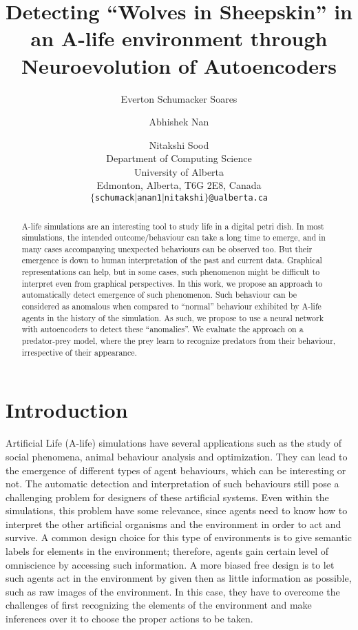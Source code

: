 \documentclass[letterpaper]{article}
\title{ Detecting ``Wolves in Sheepskin'' in an A-life environment through Neuroevolution of Autoencoders}
\author{Everton Schumacker Soares \and Abhishek Nan \and Nitakshi Sood \\
Department of Computing Science \\ University of Alberta \\
Edmonton, Alberta, T6G 2E8, Canada \\
{\tt $\{$schumack$\mid$anan1$\mid$nitakshi$\}$@ualberta.ca}}
\numberwithin{equation}{section}
\numberwithin{theorem}{section}
\numberwithin{lemma}{section}
\numberwithin{df}{section}
\begin{document}
\maketitle

\begin{abstract}
A-life simulations are an interesting tool to study life in a digital petri dish. In most simulations, the intended outcome/behaviour can take a long time to emerge, and in many cases accompanying unexpected behaviours can be observed too. But their emergence is down to human interpretation of the past and current data. Graphical representations can help, but in some cases, such phenomenon might be difficult to interpret even from graphical perspectives. In this work, we propose an approach to automatically detect emergence of such phenomenon. Such behaviour can be considered as anomalous when compared to “normal” behaviour exhibited by A-life agents in the history of the simulation. As such, we propose to use a neural network with autoencoders to detect these “anomalies”. We evaluate the approach on a predator-prey model, where the prey learn to recognize predators from their behaviour, irrespective of their appearance.
\end{abstract}

\section{Introduction}

Artificial Life (A-life) simulations have several applications such as the study of social phenomena, animal behaviour analysis and optimization. They can lead to the emergence of different types of agent behaviours, which can be interesting or not. The automatic detection and interpretation of such behaviours still pose a challenging problem for designers of these artificial systems. Even within the simulations, this problem have some relevance, since agents need to know how to interpret the other artificial organisms and the environment in order to act and survive. A common design choice for this type of environments is to give semantic labels for elements in the environment; therefore, agents gain certain level of omniscience by accessing such information. A more biased free design is to let such agents act in the environment by given then as little information as possible, such as raw images of the environment. In this case, they have to overcome the challenges of first recognizing the elements of the environment and make inferences over it to choose the proper actions to be taken. 
\end{document}
